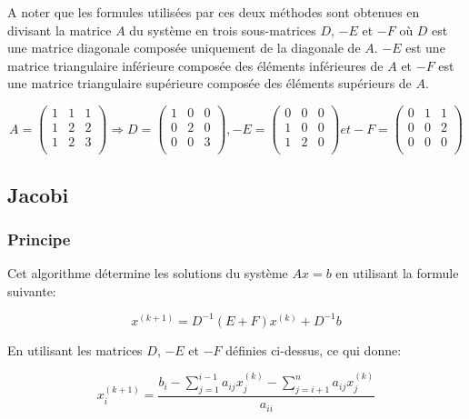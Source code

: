 \documentclass[a4paper]{article}
\begin{document}
A noter que les formules utilisées par ces deux méthodes sont obtenues en
divisant la matrice $A$ du système en trois sous-matrices $D$, $-E$ et $-F$ où
$D$ est une matrice diagonale composée uniquement de la diagonale de $A$. $-E$
est une matrice triangulaire inférieure composée des éléments inférieures de $A$
et $-F$ est une matrice triangulaire supérieure composée des éléments supérieurs
de $A$.


\[
A = 
\begin{pmatrix}
  1 & 1 & 1\\
  1 & 2 & 2\\
  1 & 2 & 3\\
\end{pmatrix} \Rightarrow
D =
\begin{pmatrix}
  1 & 0 & 0\\
  0 & 2 & 0\\
  0 & 0 & 3\\
\end{pmatrix},
-E =
\begin{pmatrix}
  0 & 0 & 0\\
  1 & 0 & 0\\
  1 & 2 & 0\\
\end{pmatrix} et
-F =
\begin{pmatrix}
  0 & 1 & 1\\
  0 & 0 & 2\\
  0 & 0 & 0\\
\end{pmatrix}
\]

\clearpage

\subsection{Jacobi}

\subsubsection{Principe}

Cet algorithme détermine les solutions du système $Ax = b$ en utilisant la
formule suivante:

\[x^{(k+1)} = D^{-1}(E+F)x^{(k)} + D^{-1}b\]

En utilisant les matrices $D$, $-E$ et $-F$ définies ci-dessus, ce qui donne:

\[x_{i}^{(k+1)} = \frac{b_{i} - \sum_{j=1}^{i-1}a_{ij}x_{j}^{(k)} -
  \sum_{j=i+1}^{n}a_{ij}x_{j}^{(k)}}{a_{ii}}\]
\end{document}
